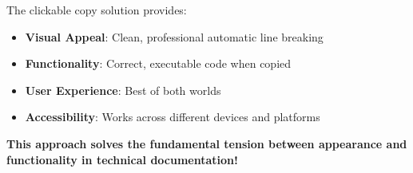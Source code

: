 \documentclass{article}
\begin{document}
The clickable copy solution provides:

\begin{itemize}
    \item \textbf{Visual Appeal}: Clean, professional automatic line breaking
    \item \textbf{Functionality}: Correct, executable code when copied
    \item \textbf{User Experience}: Best of both worlds
    \item \textbf{Accessibility}: Works across different devices and platforms
\end{itemize}

\textbf{This approach solves the fundamental tension between appearance and functionality in technical documentation!}
\end{document}
